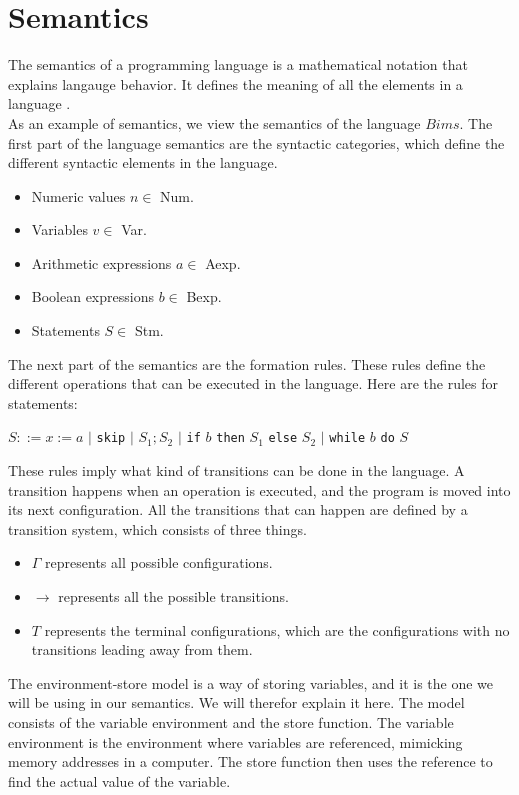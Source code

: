 \section{Semantics}
\label{sec:semantics}

The semantics of a programming language is a mathematical notation that explains langauge behavior. 
It defines the meaning of all the elements in a language \cite{misc:sem}.\\ \indent
As an example of semantics, we view the semantics of the language $Bims$. 
The first part of the language semantics are the syntactic categories, which define the different syntactic elements in the language.

\begin{itemize}
\item Numeric values $n \in$ Num.
\item Variables $v \in$ Var.
\item Arithmetic expressions $a \in$ Aexp.
\item Boolean expressions $b \in$ Bexp.
\item Statements $S \in$ Stm.
\end{itemize}

The next part of the semantics are the formation rules. 
These rules define the different operations that can be executed in the language. 
Here are the rules for statements: \newline

$S ::= x := a$ $|$ \texttt{skip} $|$ $S_1;S_2$ $|$ \texttt{if} $b$ \texttt{then} $S_1$ \texttt{else} $S_2$ $|$ \texttt{while} $b$ \texttt{do} $S$\newline

These rules imply what kind of transitions can be done in the language. 
A transition happens when an operation is executed, and the program is moved into its next configuration. 
All the transitions that can happen are defined by a transition system, which consists of three things. 

\begin{itemize}
\item $\Gamma$ represents all possible configurations. 
\item $\rightarrow$ represents all the possible transitions.
\item $T$ represents the terminal configurations, which are the configurations with no transitions leading away from them.
\end{itemize}

The environment-store model is a way of storing variables, and it is the one we will be using in our semantics. 
We will therefor explain it here. \newline
The model consists of the variable environment and the store function. 
The variable environment is the environment where variables are referenced, mimicking memory addresses in a computer. 
The store function then uses the reference to find the actual value of the variable. \newline

